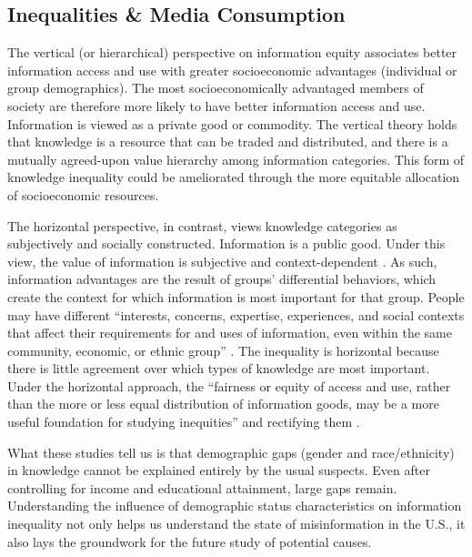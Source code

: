 \documentclass[11pt]{article}
\begin{document}
\subsection{Inequalities \& Media Consumption}

The vertical (or hierarchical) perspective on information equity associates
better information access and use with greater socioeconomic advantages
(individual or group demographics). The most socioeconomically advantaged
members of society are therefore more likely to have better information access
and use. Information is viewed as a private good or commodity. The vertical
theory holds that knowledge is a resource that can be traded and distributed,
and there is a mutually agreed-upon value hierarchy among information
categories. This form of knowledge inequality could be ameliorated through the
more equitable allocation of socioeconomic resources.

The horizontal perspective, in contrast, views knowledge categories as
subjectively and socially constructed. Information is a public good. Under this
view, the value of information is subjective and context-dependent
\citep{Lievrouw}. As such, information advantages are the result of groups'
differential behaviors, which create the context for which information is most
important for that group. People may have different ``interests, concerns,
expertise, experiences, and social contexts that affect their requirements for
and uses of information, even within the same community, economic, or ethnic
group'' \citep[501]{Lievrouw}. The inequality is horizontal because there is
little agreement over which types of knowledge are most important. Under the
horizontal approach, the ``fairness or equity of access and use, rather than the
more or less equal distribution of information goods, may be a more useful
foundation for studying inequities'' and rectifying them \citep[501]{Lievrouw}.





What these studies tell us is that demographic gaps (gender and race/ethnicity)
in knowledge cannot be explained entirely by the usual suspects. Even after
controlling for income and educational attainment, large gaps remain.
Understanding the influence of demographic status characteristics on information
inequality not only helps us understand the state of misinformation in the U.S.,
it also lays the groundwork for the future study of potential causes.
\end{document}
